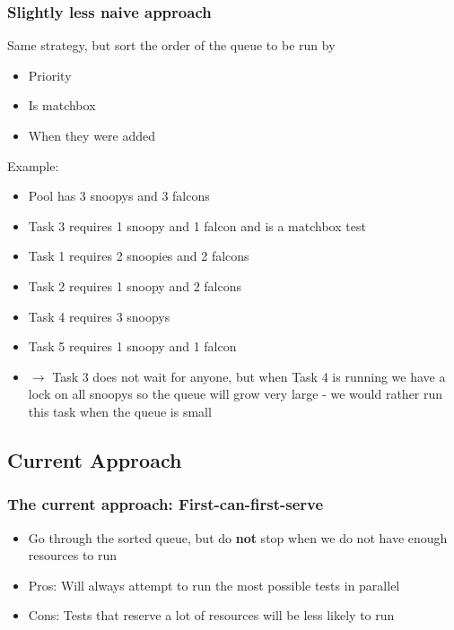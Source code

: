 \documentclass[xcolor=pdftex,dvipsnames,table]{beamer}
\begin{document}
\begin{frame}
\frametitle{Slightly less naive approach}
Same strategy, but sort the order of the queue to be run by
\begin{itemize}
  \item Priority
  \item Is matchbox
  \item When they were added 
\end{itemize}
\end{frame}

\begin{frame}
Example:
\begin{itemize}
  \item Pool has 3 snoopys and 3 falcons
  \item Task 3 requires 1 snoopy and 1 falcon and is a matchbox test
  \item Task 1 requires 2 snoopies and 2 falcons
  \item Task 2 requires 1 snoopy and 2 falcons
  \item Task 4 requires 3 snoopys
  \item Task 5 requires 1 snoopy and 1 falcon
  \item $\rightarrow$ Task 3 does not wait for anyone, but when Task 4
    is running we have a lock on all snoopys so the queue will grow
    very large - we would rather run this task when the queue is small
\end{itemize}
\end{frame}

\subsection{Current Approach}

\begin{frame}
\frametitle{The current approach: First-can-first-serve}
\begin{itemize}
  \item Go through the sorted queue, but do \textbf{not} stop when we
    do not have enough resources to run
  \item Pros: Will always attempt to run the most possible tests in parallel
  \item Cons: Tests that reserve a lot of resources will be less
    likely to run
\end{itemize}
\end{frame}
\end{document}
